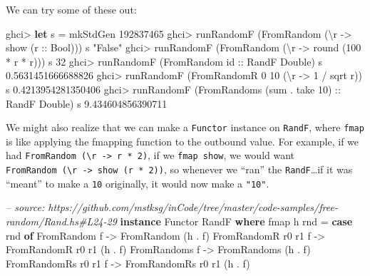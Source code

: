 \documentclass[]{article}
\newenvironment{Shaded}{}{}
\newcommand{\KeywordTok}[1]{\textcolor[rgb]{0.00,0.44,0.13}{\textbf{{#1}}}}
\newcommand{\DataTypeTok}[1]{\textcolor[rgb]{0.56,0.13,0.00}{{#1}}}
\newcommand{\DecValTok}[1]{\textcolor[rgb]{0.25,0.63,0.44}{{#1}}}
\newcommand{\FloatTok}[1]{\textcolor[rgb]{0.25,0.63,0.44}{{#1}}}
\newcommand{\StringTok}[1]{\textcolor[rgb]{0.25,0.44,0.63}{{#1}}}
\newcommand{\CommentTok}[1]{\textcolor[rgb]{0.38,0.63,0.69}{\textit{{#1}}}}
\newcommand{\OtherTok}[1]{\textcolor[rgb]{0.00,0.44,0.13}{{#1}}}
\newcommand{\FunctionTok}[1]{\textcolor[rgb]{0.02,0.16,0.49}{{#1}}}
\newcommand{\NormalTok}[1]{{#1}}
\begin{document}
We can try some of these out:

\begin{Shaded}
\begin{Highlighting}[]
\NormalTok{ghci}\FunctionTok{>} \KeywordTok{let} \NormalTok{s }\FunctionTok{=} \NormalTok{mkStdGen }\DecValTok{192837465}
\NormalTok{ghci}\FunctionTok{>} \NormalTok{runRandomF (}\DataTypeTok{FromRandom} \NormalTok{(\textbackslash{}r }\OtherTok{->} \NormalTok{show (}\OtherTok{r ::} \DataTypeTok{Bool}\NormalTok{))) s}
\StringTok{"False"}
\NormalTok{ghci}\FunctionTok{>} \NormalTok{runRandomF (}\DataTypeTok{FromRandom} \NormalTok{(\textbackslash{}r }\OtherTok{->} \NormalTok{round (}\DecValTok{100} \FunctionTok{*} \NormalTok{r }\FunctionTok{*} \NormalTok{r))) s}
\DecValTok{32}
\NormalTok{ghci}\FunctionTok{>} \NormalTok{runRandomF (}\DataTypeTok{FromRandom}\OtherTok{ id ::} \DataTypeTok{RandF} \DataTypeTok{Double}\NormalTok{) s}
\FloatTok{0.5631451666688826}
\NormalTok{ghci}\FunctionTok{>} \NormalTok{runRandomF (}\DataTypeTok{FromRandomR} \DecValTok{0} \DecValTok{10} \NormalTok{(\textbackslash{}r }\OtherTok{->} \DecValTok{1} \FunctionTok{/} \NormalTok{sqrt r)) s}
\FloatTok{0.4213954281350406}
\NormalTok{ghci}\FunctionTok{>} \NormalTok{runRandomF (}\DataTypeTok{FromRandoms} \NormalTok{(sum }\FunctionTok{.} \NormalTok{take }\DecValTok{10}\NormalTok{)}\OtherTok{ ::} \DataTypeTok{RandF} \DataTypeTok{Double}\NormalTok{) s}
\FloatTok{9.434604856390711}
\end{Highlighting}
\end{Shaded}

We might also realize that we can make a \texttt{Functor} instance on
\texttt{RandF}, where \texttt{fmap} is like applying the fmapping function to
the outbound value. For example, if we had
\texttt{FromRandom\ (\textbackslash{}r\ -\textgreater{}\ r\ *\ 2)}, if we
\texttt{fmap\ show}, we would want
\texttt{FromRandom\ (\textbackslash{}r\ -\textgreater{}\ show\ (r\ *\ 2))}, so
whenever we ``ran'' the \texttt{RandF}\ldots{}if it was ``meant'' to make a
\texttt{10} originally, it would now make a \texttt{"10"}.

\begin{Shaded}
\begin{Highlighting}[]
\CommentTok{-- source: https://github.com/mstksg/inCode/tree/master/code-samples/free-random/Rand.hs#L24-29}
\KeywordTok{instance} \DataTypeTok{Functor} \DataTypeTok{RandF} \KeywordTok{where}
    \NormalTok{fmap h rnd }\FunctionTok{=} \KeywordTok{case} \NormalTok{rnd }\KeywordTok{of}
        \DataTypeTok{FromRandom}         \NormalTok{f }\OtherTok{->} \DataTypeTok{FromRandom}         \NormalTok{(h }\FunctionTok{.} \NormalTok{f)}
        \DataTypeTok{FromRandomR} \NormalTok{r0 r1  f }\OtherTok{->} \DataTypeTok{FromRandomR} \NormalTok{r0 r1  (h }\FunctionTok{.} \NormalTok{f)}
        \DataTypeTok{FromRandoms}        \NormalTok{f }\OtherTok{->} \DataTypeTok{FromRandoms}        \NormalTok{(h }\FunctionTok{.} \NormalTok{f)}
        \DataTypeTok{FromRandomRs} \NormalTok{r0 r1 f }\OtherTok{->} \DataTypeTok{FromRandomRs} \NormalTok{r0 r1 (h }\FunctionTok{.} \NormalTok{f)}
\end{Highlighting}
\end{Shaded}
\end{document}
